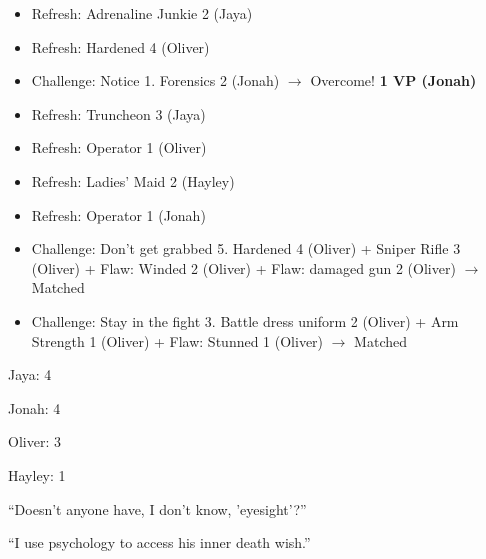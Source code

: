\begin{itemize}[noitemsep,topsep=0pt]
\item Refresh: Adrenaline Junkie 2 (Jaya)
\item Refresh: Hardened 4 (Oliver)
\item Challenge: Notice 1.  Forensics 2 (Jonah) $\rightarrow$ Overcome! \textbf{1 VP (Jonah)}
\item Refresh: Truncheon 3 (Jaya)
\item Refresh: Operator 1 (Oliver)
\item Refresh: Ladies' Maid 2 (Hayley)
\item Refresh: Operator 1 (Jonah)
\item Challenge: Don't get grabbed 5.  Hardened 4 (Oliver) + Sniper Rifle 3 (Oliver) +  {\color[RGB]{255,0,0}Flaw: Winded 2 (Oliver)}  +  {\color[RGB]{255,0,0}Flaw: damaged gun 2 (Oliver)}  $\rightarrow$ Matched
\item Challenge: Stay in the fight 3.  Battle dress uniform 2 (Oliver) + Arm Strength 1 (Oliver) +  {\color[RGB]{255,0,0}Flaw: Stunned 1 (Oliver)}  $\rightarrow$ Matched
\end{itemize}






{
\parskip=0pt
Jaya: 4

Jonah: 4

Oliver: 3

Hayley: 1
}






``Doesn't anyone have, I don't know, 'eyesight'?'' 




``I use psychology to access his inner death wish.'' 



